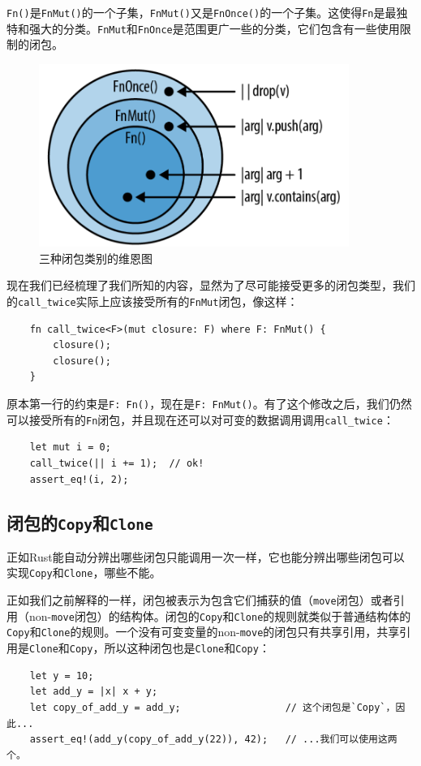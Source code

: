 \texttt{Fn()}是\texttt{FnMut()}的一个子集，\texttt{FnMut()}又是\texttt{FnOnce()}的一个子集。这使得\texttt{Fn}是最独特和强大的分类。\texttt{FnMut}和\texttt{FnOnce}是范围更广一些的分类，它们包含有一些使用限制的闭包。

\begin{figure}[htbp]
    \centering
    \includegraphics[width=0.9\textwidth]{../img/f14-2.png}
    \caption{三种闭包类别的维恩图}
    \label{f14-2}
\end{figure}

现在我们已经梳理了我们所知的内容，显然为了尽可能接受更多的闭包类型，我们的\texttt{call\_twice}实际上应该接受所有的\texttt{FnMut}闭包，像这样：
\begin{verbatim}
    fn call_twice<F>(mut closure: F) where F: FnMut() {
        closure();
        closure();
    }
\end{verbatim}

原本第一行的约束是\texttt{F: Fn()}，现在是\texttt{F: FnMut()}。有了这个修改之后，我们仍然可以接受所有的\texttt{Fn}闭包，并且现在还可以对可变的数据调用调用\texttt{call\_twice}：
\begin{verbatim}
    let mut i = 0;
    call_twice(|| i += 1);  // ok!
    assert_eq!(i, 2);
\end{verbatim}

\subsection{闭包的\texttt{Copy}和\texttt{Clone}}
正如Rust能自动分辨出哪些闭包只能调用一次一样，它也能分辨出哪些闭包可以实现\texttt{Copy}和\texttt{Clone}，哪些不能。

正如我们之前解释的一样，闭包被表示为包含它们捕获的值（\texttt{move}闭包）或者引用（non-\texttt{move}闭包）的结构体。闭包的\texttt{Copy}和\texttt{Clone}的规则就类似于普通结构体的\texttt{Copy}和\texttt{Clone}的规则。一个没有可变变量的non-\texttt{move}的闭包只有共享引用，共享引用是\texttt{Clone}和\texttt{Copy}，所以这种闭包也是\texttt{Clone}和\texttt{Copy}：
\begin{verbatim}
    let y = 10;
    let add_y = |x| x + y;
    let copy_of_add_y = add_y;                  // 这个闭包是`Copy`，因此...
    assert_eq!(add_y(copy_of_add_y(22)), 42);   // ...我们可以使用这两个。
\end{verbatim}

